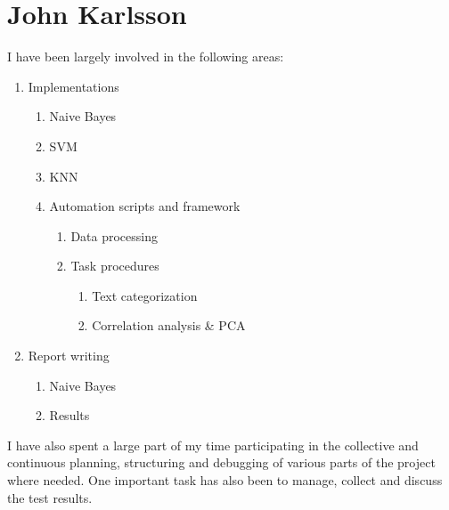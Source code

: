 \newpage
\section*{John Karlsson}
I have been largely involved in the following areas:
\begin{enumerate}
  \item Implementations
  \begin{enumerate}
    \item Naive Bayes
    \item SVM
    \item KNN
    \item Automation scripts and framework
    \begin{enumerate}
    	\item Data processing
    	\item Task procedures
    	\begin{enumerate}
    		\item Text categorization
    		\item Correlation analysis \& PCA
    	\end{enumerate}
    \end{enumerate}
  \end{enumerate}
  \item Report writing
  \begin{enumerate}
  \item Naive Bayes
  \item Results
  \end{enumerate}
\end{enumerate}
I have also spent a large part of my time participating in the collective and continuous planning, structuring and debugging of various parts of the project where needed. One important task has also been to manage, collect and discuss the test results.
